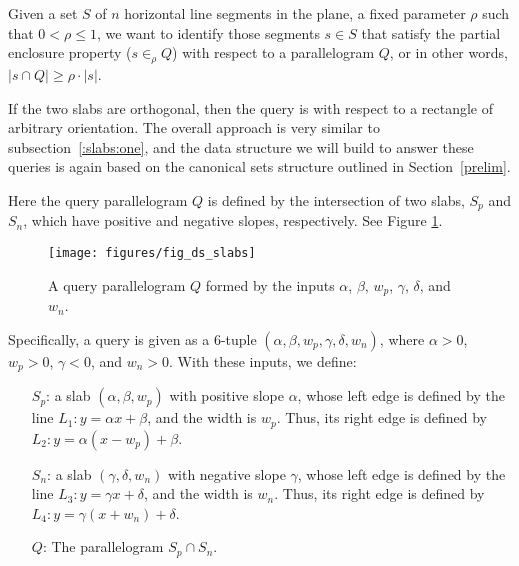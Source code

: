 \begin{problem}
Given a set $S$ of $n$ horizontal line segments in the plane, a fixed parameter 
$\rho$ such that $0 < \rho \leq 1$, we want to identify those segments $s \in S$ 
that satisfy 
the partial enclosure property ($s \in_\rho Q$) with respect to a parallelogram 
$Q$, or in other words,  $|s \cap Q| \geq \rho \cdot |s|$.
\end{problem}

If the two slabs are orthogonal, then the query is with respect to a 
rectangle of arbitrary orientation.  
The overall approach is very similar to subsection~\ref{:slabs:one}, and the 
data structure we will build to answer these queries is again based on the 
canonical sets structure outlined in Section~\ref{prelim}.



Here the query parallelogram $Q$ is defined by the intersection of two slabs, $S_p$ 
and $S_n$, which have positive and negative slopes, respectively. See Figure 
\ref{fig:slabs:two:ds}.

\begin{figure}[t]
\begin{center}
  \texttt{[image: figures/fig\_ds\_slabs]}
  \caption{A query parallelogram $Q$ formed by the inputs $\alpha$, $\beta$, 
$w_p$,
  $\gamma$, $\delta$, and $w_n$.}
  \label{fig:slabs:two:ds}
\end{center}
\end{figure}

Specifically, a query is given as a 6-tuple $(\alpha, \beta, w_p, \gamma, 
\delta, 
w_n)$, where $\alpha > 0$, $w_p > 0$, $\gamma < 0$, and $w_n > 0$. With these 
inputs, we define:

\begin{itemize}
 \item[$S_p$:] a slab $(\alpha,\beta,w_p)$ with positive slope $\alpha$, whose 
left edge is defined 
 by the line $L_1 : y = \alpha x + \beta$, and the width is $w_p$. Thus, its 
right edge 
 is defined by $L_2 : y = \alpha (x - w_p) + \beta$.
 \item[$S_n$:] a slab $(\gamma,\delta,w_n)$ with negative slope $\gamma$, whose 
left edge is defined 
 by the line $L_3 : y = \gamma x + \delta$, and the width is $w_n$. Thus, its 
right edge 
 is defined by $L_4 : y = \gamma (x + w_n) + \delta$.
 \item[$Q$:] The parallelogram $S_p \cap S_n$.
\end{itemize}




